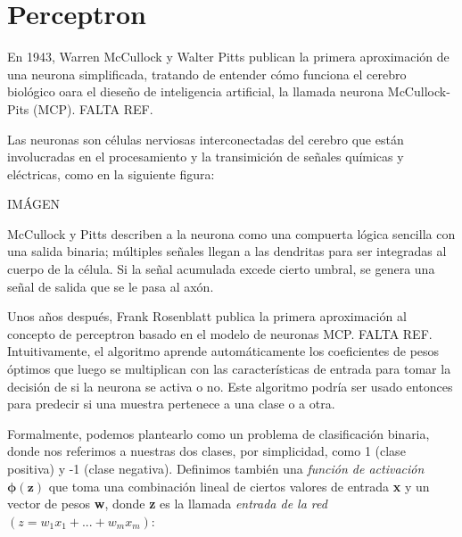 \documentclass{book}
\begin{document}
\section{Perceptron}
En 1943, Warren McCullock y Walter Pitts publican la primera aproximación de una
neurona simplificada, tratando de entender cómo funciona el cerebro biológico oara
el dieseño de inteligencia artificial, la llamada neurona McCullock-Pits (MCP).
FALTA REF.

Las neuronas son células nerviosas interconectadas del cerebro que están involucradas
en el procesamiento y la transimición de señales químicas y eléctricas, como en la
siguiente figura:

IMÁGEN

McCullock y Pitts describen a la neurona como una compuerta lógica sencilla con una
salida binaria; múltiples señales llegan a las dendritas para ser integradas al cuerpo
de la célula. Si la señal acumulada excede cierto umbral, se genera una señal de salida
que se le pasa al axón.

Unos años después, Frank Rosenblatt publica la primera aproximación al concepto de
perceptron basado en el modelo de neuronas MCP. FALTA REF. Intuitivamente, el algoritmo
aprende automáticamente los coeficientes de pesos óptimos que luego se multiplican
con las características de entrada para tomar la decisión de si la neurona se activa
o no. Este algoritmo podría ser usado entonces para predecir si una muestra pertenece
a una clase o a otra.

Formalmente, podemos plantearlo como un problema de clasificación binaria, donde nos
referimos a nuestras dos clases, por simplicidad, como 1 (clase positiva) y -1
(clase negativa). Definimos también una \textit{función de activación $\mathbf{\phi (z)}$}
que toma una combinación lineal de ciertos valores de entrada \textbf{x} y un
vector de pesos \textbf{w}, donde \textbf{z} es la llamada \textit{entrada de la red}
$(z = w_1x_1 + ... + w_mx_m)$:
\end{document}
